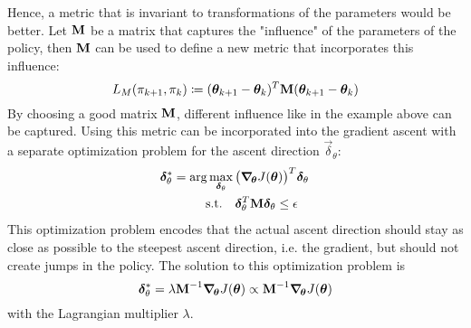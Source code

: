 			Hence, a metric that is invariant to transformations of the parameters would be better. Let \(\bm{\mathrm{M}}\) be a matrix that captures the "influence" of the parameters of the policy, then \(\bm{\mathrm{M}}\) can be used to define a new metric that incorporates this influence:
			\begin{equation*}
				L_M(\pi_{k + 1}, \pi_k) \coloneqq (\bm{\theta}_{k + 1} - \bm{\theta}_k)^T \bm{\mathrm{M}} (\bm{\theta}_{k + 1} - \bm{\theta}_k)
			\end{equation*}
			By choosing a good matrix \(\bm{\mathrm{M}}\), different influence like in the example above can be captured. Using this metric can be incorporated into the gradient ascent with a separate optimization problem for the ascent direction \( \vec{\delta}_\theta \):
			\begin{equation}
				\begin{aligned}
					\bm{\delta}_\theta^\ast = \arg\max_{\bm{\delta}_\theta} \,& \big( \grad_{\!\bm{\theta}} J(\bm{\theta}) \big)^T \bm{\delta}_\theta \\
					\mathrm{s.t.} \quad&
						\begin{aligned}[t]
							\bm{\delta}_\theta^T \bm{\mathrm{M}} \bm{\delta}_\theta & \leq \epsilon
						\end{aligned}
				\end{aligned}  \label{eq:policyGradientAscentOpt}
			\end{equation}
			This optimization problem encodes that the actual ascent direction should stay as close as possible to the steepest ascent direction, i.e. the gradient, but should not create jumps in the policy. The solution to this optimization problem is
			\begin{equation*}
				\bm{\delta}_\theta^\ast = \lambda \bm{\mathrm{M}}^{-1} \grad_{\!\bm{\theta}} J(\bm{\theta}) \propto \bm{\mathrm{M}}^{-1} \grad_{\!\bm{\theta}} J(\bm{\theta})
			\end{equation*}
			with the Lagrangian multiplier \(\lambda\).

